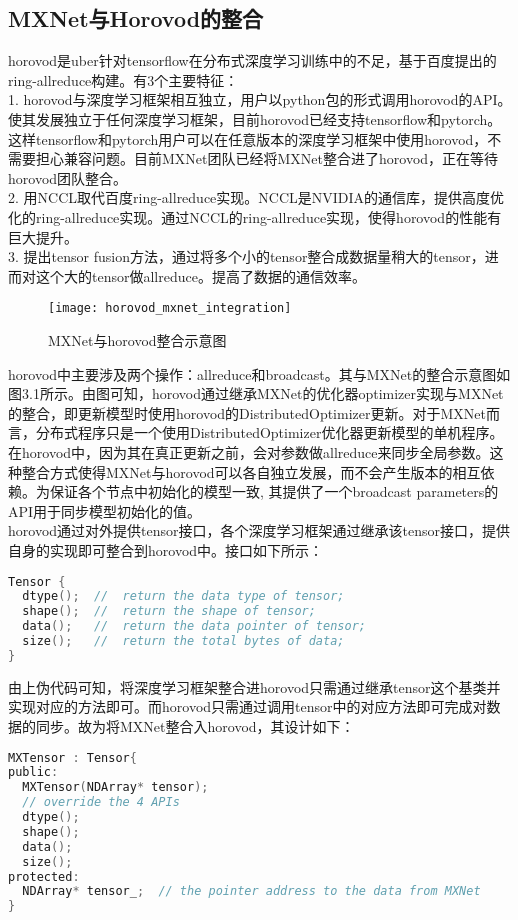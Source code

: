 \subsection{MXNet与Horovod的整合}
horovod是uber针对tensorflow在分布式深度学习训练中的不足，基于百度提出的ring-allreduce构建。有3个主要特征：\\
1. horovod与深度学习框架相互独立，用户以python包的形式调用horovod的API。使其发展独立于任何深度学习框架，目前horovod已经支持tensorflow和pytorch。这样tensorflow和pytorch用户可以在任意版本的深度学习框架中使用horovod，不需要担心兼容问题。目前MXNet团队已经将MXNet整合进了horovod，正在等待horovod团队整合。\\
2. 用NCCL取代百度ring-allreduce实现。NCCL是NVIDIA的通信库，提供高度优化的ring-allreduce实现。通过NCCL的ring-allreduce实现，使得horovod的性能有巨大提升。\\
3. 提出tensor fusion方法，通过将多个小的tensor整合成数据量稍大的tensor，进而对这个大的tensor做allreduce。提高了数据的通信效率。\\
\begin{figure}[htp]
\centering
\texttt{[image: horovod\_mxnet\_integration]}
\caption{MXNet与horovod整合示意图}
\end{figure}
horovod中主要涉及两个操作：allreduce和broadcast。其与MXNet的整合示意图如图3.1所示。由图可知，horovod通过继承MXNet的优化器optimizer实现与MXNet的整合，即更新模型时使用horovod的DistributedOptimizer更新。对于MXNet而言，分布式程序只是一个使用DistributedOptimizer优化器更新模型的单机程序。在horovod中，因为其在真正更新之前，会对参数做allreduce来同步全局参数。这种整合方式使得MXNet与horovod可以各自独立发展，而不会产生版本的相互依赖。为保证各个节点中初始化的模型一致, 其提供了一个broadcast parameters的API用于同步模型初始化的值。\\
horovod通过对外提供tensor接口，各个深度学习框架通过继承该tensor接口，提供自身的实现即可整合到horovod中。接口如下所示：
\begin{lstlisting}[language=C, numbers=none]
Tensor {
  dtype();  //  return the data type of tensor;
  shape();  //  return the shape of tensor;
  data();   //  return the data pointer of tensor;
  size();   //  return the total bytes of data;
}
\end{lstlisting}
由上伪代码可知，将深度学习框架整合进horovod只需通过继承tensor这个基类并实现对应的方法即可。而horovod只需通过调用tensor中的对应方法即可完成对数据的同步。故为将MXNet整合入horovod，其设计如下：
\begin{lstlisting}[language=C, numbers=none]
MXTensor : Tensor{
public:
  MXTensor(NDArray* tensor);
  // override the 4 APIs
  dtype();
  shape();
  data();
  size();
protected:
  NDArray* tensor_;  // the pointer address to the data from MXNet
}
\end{lstlisting}
